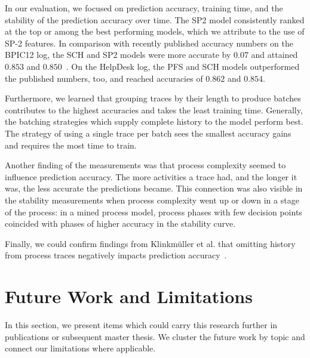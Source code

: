 In our evaluation, we focused on prediction accuracy, training time, and the stability of the prediction accuracy over time.
The SP2 model consistently ranked at the top or among the best performing models, which we attribute to the use of SP-2 features. In comparison with recently published accuracy numbers on the BPIC12 log, the SCH and SP2 models were more accurate by $0.07$ and attained $0.853$ and $0.850$~\cite{boehmer2018probability, evermann2016}.
On the HelpDesk log, the PFS and SCH models outperformed the published numbers, too, and reached accuracies of $0.862$ and $0.854$.

Furthermore, we learned that grouping traces by their length to produce batches contributes to the highest accuracies and takes the least training time.
Generally, the batching strategies which supply complete history to the model perform best.
The strategy of using a single trace per batch sees the smallest accuracy gains and requires the most time to train.

Another finding of the measurements was that process complexity seemed to influence prediction accuracy.
The more activities a trace had, and the longer it was, the less accurate the predictions became.
This connection was also visible in the stability measurements when process complexity went up or down in a stage of the process:
in a mined process model, process phases with few decision points coincided with phases of higher accuracy in the stability curve.


Finally, we could confirm findings from Klinkmüller et al. that omitting history from process traces negatively impacts prediction accuracy~\cite{klinkmuller2018reliablemonitoring}.

\section{Future Work and Limitations}\label{sec:conclusion:future-work}
In this section, we present items which could carry this research further in publications or subsequent master thesis.
We cluster the future work by topic and connect our limitations where applicable.

